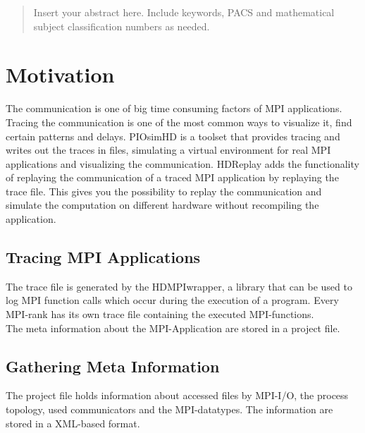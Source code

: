 \date{Received: date / Accepted: date}


\maketitle

\begin{abstract}
Insert your abstract here. Include keywords, PACS and mathematical
subject classification numbers as needed.
\end{abstract}

\section{Motivation}
\label{motivation}
The communication is one of big time consuming factors of MPI applications.
Tracing the communication is one of the most common ways to visualize it,
find certain patterns and delays. %
PIOsimHD is a toolset that provides tracing and writes out the traces in files,
simulating a virtual environment for real MPI applications and visualizing the
communication. HDReplay adds the functionality of replaying the communication of
a traced MPI application by replaying the trace file. This gives you the
possibility to replay the communication and simulate the computation on
different hardware without recompiling the application.



\subsection{Tracing MPI Applications}
\label{tracing}
The trace file is generated by the HDMPIwrapper, a library that can be used to
log MPI function calls which occur during the execution of a program. Every 
MPI-rank has its own trace file containing the executed MPI-functions.\\
The meta information about the MPI-Application are stored in a project file.

\subsection*{Gathering Meta Information}
The project file holds information about accessed files by MPI-I/O, the 
process topology, used communicators and the MPI-datatypes. The information
are stored in a XML-based format.\\[2ex]

